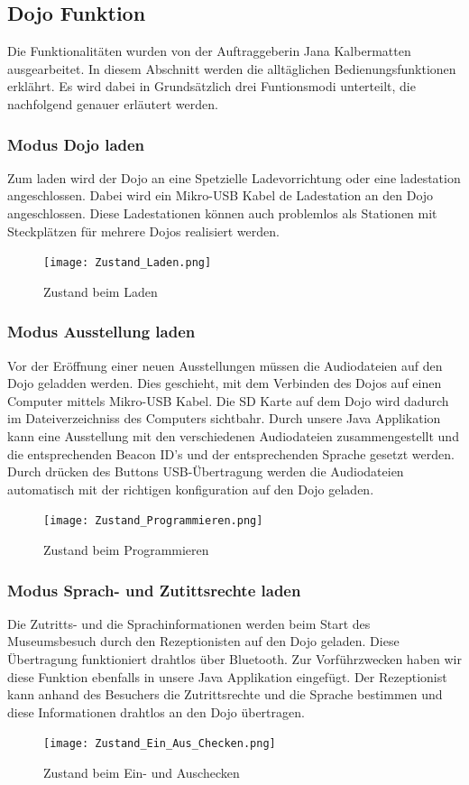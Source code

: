 \subsection{Dojo Funktion}
Die Funktionalitäten wurden von der Auftraggeberin Jana Kalbermatten ausgearbeitet. In diesem Abschnitt werden die alltäglichen Bedienungsfunktionen erklährt. Es wird dabei in Grundsätzlich drei Funtionsmodi unterteilt, die nachfolgend genauer erläutert werden.
\subsubsection{Modus Dojo laden}
Zum laden wird der Dojo an eine Spetzielle Ladevorrichtung oder eine ladestation angeschlossen. Dabei wird ein Mikro-USB Kabel de Ladestation an den Dojo angeschlossen. Diese Ladestationen können auch problemlos als Stationen mit Steckplätzen für mehrere Dojos realisiert werden.
\begin{figure}[htb]
\texttt{[image: Zustand\_Laden.png]}
\caption{Zustand beim Laden} %
\label{fig:image2}
\end{figure}
\subsubsection{Modus Ausstellung laden}
Vor der Eröffnung einer neuen Ausstellungen müssen die Audiodateien auf den Dojo geladden werden. Dies geschieht, mit dem Verbinden des Dojos auf einen Computer mittels Mikro-USB Kabel. Die SD Karte auf dem Dojo wird dadurch im Dateiverzeichniss des Computers sichtbahr. Durch unsere Java Applikation kann eine Ausstellung mit den verschiedenen Audiodateien zusammengestellt und die entsprechenden Beacon ID's und der entsprechenden Sprache gesetzt werden. Durch drücken des Buttons USB-Übertragung werden die Audiodateien automatisch mit der richtigen konfiguration auf den Dojo geladen.
\begin{figure}[htb]
\texttt{[image: Zustand\_Programmieren.png]}
\caption{Zustand beim Programmieren} %
\label{fig:image3}
\end{figure}
\subsubsection{Modus Sprach- und Zutittsrechte laden}
Die Zutritts- und die Sprachinformationen werden beim Start des Museumsbesuch durch den Rezeptionisten auf den Dojo geladen. Diese Übertragung funktioniert drahtlos über Bluetooth. Zur Vorführzwecken haben wir diese Funktion ebenfalls in unsere Java Applikation eingefügt. Der Rezeptionist kann anhand des Besuchers die Zutrittsrechte und die Sprache bestimmen und diese Informationen drahtlos an den Dojo übertragen.
\begin{figure}[htb]
\texttt{[image: Zustand\_Ein\_Aus\_Checken.png]}
\caption{Zustand beim Ein- und Auschecken} %
\label{fig:image1}
\end{figure}
